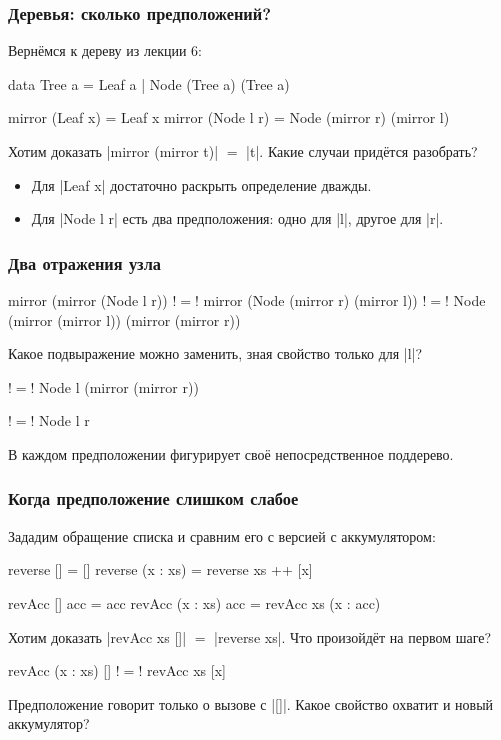 \documentclass[11pt]{beamer}
\begin{document}
\begin{frame}[fragile]
  \frametitle{Деревья: сколько предположений?}
  Вернёмся к дереву из лекции 6:
  \begin{haskell}
    data Tree a = Leaf a | Node (Tree a) (Tree a)

    mirror (Leaf x)   = Leaf x
    mirror (Node l r) = Node (mirror r) (mirror l)
  \end{haskell}
  Хотим доказать \haskinline|mirror (mirror t)| $=$ \haskinline|t|. Какие случаи придётся разобрать? \pause
  \begin{itemize}
    \item Для \haskinline|Leaf x| достаточно раскрыть определение дважды.
    \item Для \haskinline|Node l r| есть два предположения: одно для \haskinline|l|, другое для \haskinline|r|.
  \end{itemize}
\end{frame}

\begin{frame}[fragile]
  \frametitle{Два отражения узла}
  \begin{haskell}
      mirror (mirror (Node l r))
    !$=$! mirror (Node (mirror r) (mirror l))
    !$=$! Node (mirror (mirror l)) (mirror (mirror r))
  \end{haskell}
  Какое подвыражение можно заменить, зная свойство только для \haskinline|l|? \pause
  \begin{haskell}
    !$=$! Node l (mirror (mirror r))
  \end{haskell}
  \pause
  \begin{haskell}
    !$=$! Node l r
  \end{haskell}
  В каждом предположении фигурирует своё непосредственное поддерево.
\end{frame}

\begin{frame}[fragile]
  \frametitle{Когда предположение слишком слабое}
  Зададим обращение списка и сравним его с версией с аккумулятором:
  \begin{haskellsmall}
    reverse []       = []
    reverse (x : xs) = reverse xs ++ [x]

    revAcc []       acc = acc
    revAcc (x : xs) acc = revAcc xs (x : acc)
  \end{haskellsmall}
  Хотим доказать \haskinline|revAcc xs []| $=$ \haskinline|reverse xs|. Что произойдёт на первом шаге? \pause
  \begin{haskell}
      revAcc (x : xs) []
    !$=$! revAcc xs [x]
  \end{haskell}
  Предположение говорит только о вызове с \haskinline|[]|. Какое свойство охватит и новый аккумулятор?
\end{frame}
\end{document}
